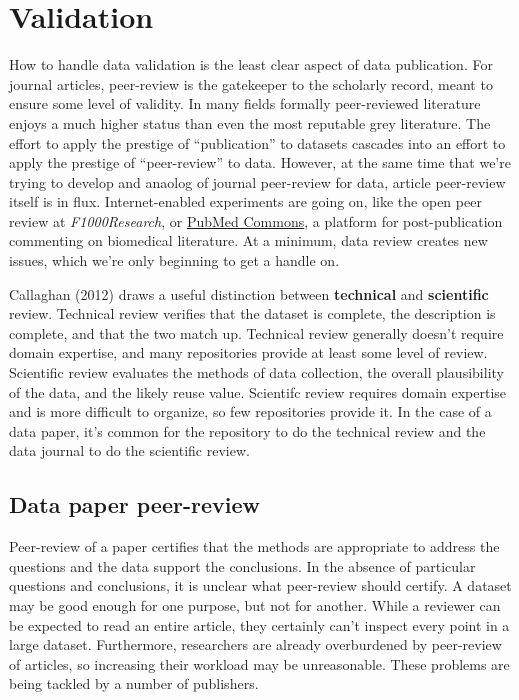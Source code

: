 \documentclass[10pt,twocolumn]{article}
\begin{document}
\section*{Validation}\label{validation}

How to handle data validation is the least clear aspect of data publication.
For journal articles, peer-review is the gatekeeper to the scholarly record, meant to ensure some level of validity.
In many fields formally peer-reviewed literature enjoys a much higher status than even the most reputable grey literature.
The effort to apply the prestige of ``publication'' to datasets cascades into an effort to apply the prestige of ``peer-review'' to data.
However, at the same time that we're trying to develop and anaolog of journal peer-review for data, article peer-review itself is in flux.
Internet-enabled experiments are going on, like the open peer review at \emph{F1000Research}, or \href{http://www.ncbi.nlm.nih.gov/pubmedcommons/}{PubMed Commons}, a platform for post-publication commenting on biomedical literature.
At a minimum, data review creates new issues, which we're only beginning to get a handle on.

Callaghan (2012)\cite{sarah_callaghan_making_2012} draws a useful distinction between \textbf{technical} and \textbf{scientific} review.
Technical review verifies that the dataset is complete, the description is complete, and that the two match up.
Technical review generally doesn't require domain expertise, and many repositories provide at least some level of review.
Scientific review evaluates the methods of data collection, the overall plausibility of the data, and the likely reuse value.
Scientifc review requires domain expertise and is more difficult to organize, so few repositories provide it.
In the case of a data paper, it's common for the repository to do the technical review and the data journal to do the scientific review.

\subsection*{Data paper peer-review}\label{data-paper-peer-review}

Peer-review of a paper certifies that the methods are appropriate to address the questions and the data support the conclusions.
In the absence of particular questions and conclusions, it is unclear what peer-review should certify.
A dataset may be good enough for one purpose, but not for another.\cite{parsons_data_2010}
While a reviewer can be expected to read an entire article, they certainly can't inspect every point in a large dataset.
Furthermore, researchers are already overburdened by peer-review of articles, so increasing their workload may be unreasonable.
These problems are being tackled by a number of publishers.
\end{document}

